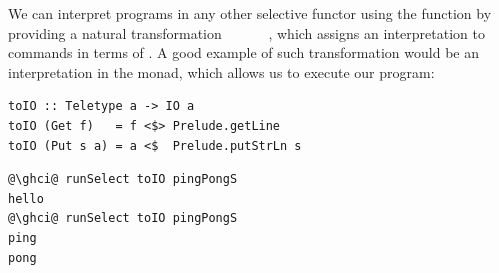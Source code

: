 We can interpret  programs in any other selective functor using
the  function by providing a natural transformation
~~~~\hs{->}~~, which assigns an
interpretation to  commands in terms of . A good example of
such transformation would be an interpretation in the  monad, which
allows us to execute our  program:

\vspace{1mm}
\begin{verbatim}
toIO :: Teletype a -> IO a
toIO (Get f)   = f <$> Prelude.getLine
toIO (Put s a) = a <$  Prelude.putStrLn s
\end{verbatim}
\vspace{1mm}
\begin{verbatim}
@\ghci@ runSelect toIO pingPongS
hello
@\ghci@ runSelect toIO pingPongS
ping
pong
\end{verbatim}
\vspace{1mm}





